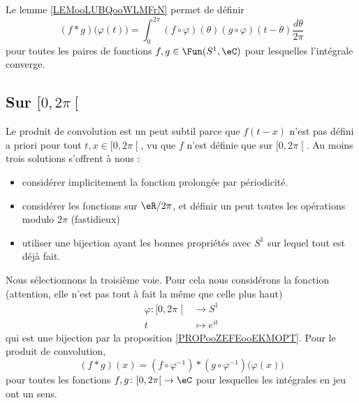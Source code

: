 \begin{definition}
    Le lemme \ref{LEMooLUBQooWLMFrN} permet de définir
    \begin{equation}
        (f*g)\big( \varphi(t) \big)=\int_0^{2\pi}(f\circ \varphi)(\theta)(g\circ\varphi)(t-\theta)\frac{ d\theta }{ 2\pi }
    \end{equation}
    pour toutes les paires de fonctions \( f,g\in \Fun(S^1,\eC)\) pour lesquelles l'intégrale converge.
\end{definition}



\subsection{Sur \( \mathopen[ 0 , 2\pi \mathclose[\)} 

Le produit de convolution est un peut subtil parce que \( f(t-x)\) n'est pas défini a priori pour tout \( t,x\in \mathopen[ 0 , 2\pi \mathclose[\), vu que \( f\) n'est définie que sur \( \mathopen[ 0 , 2\pi \mathclose[\). Au moins trois solutions s'offrent à nous :
\begin{itemize}
    \item 
       considérer implicitement la fonction prolongée par périodicité.
   \item
       considérer les fonctions sur \( \eR/2\pi\), et définir un peut toutes les opérations modulo \( 2\pi\) (fastidieux)
   \item
       utiliser une bijection ayant les bonnes propriétés avec \( S^1\) sur lequel tout est déjà fait.
\end{itemize}
Nous sélectionnons la troisième voie. Pour cela nous considérons la fonction (attention, elle n'est pas tout à fait la même que celle plus haut)
\begin{equation}
    \begin{aligned}
        \varphi\colon \mathopen[ 0 , 2\pi \mathclose[&\to S^1 \\
            t&\mapsto  e^{it} 
    \end{aligned}
\end{equation}
qui est une bijection par la proposition \ref{PROPooZEFEooEKMOPT}. Pour le produit de convolution,
\begin{equation}
    (f * g)(x)=(f\circ \varphi^{-1})*(g\circ\varphi^{-1})\big( \varphi(x) \big)
\end{equation}
pour toutes les fonctions \( f,g\colon \mathopen[ 0 , 2\pi \mathclose[\to \eC\) pour lesquelles les intégrales en jeu ont un sens.

